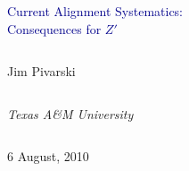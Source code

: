 \documentclass[compress]{beamer}
\begin{document}
\begin{frame}
\vfill
\begin{center}
\textcolor{darkblue}{\Large Current Alignment Systematics: \\ \vspace{0.2 cm} Consequences for $Z'$}

\vfill
\begin{columns}
\begin{center}
\large
Jim Pivarski
\end{center}
\end{columns}

\begin{columns}
\begin{center}
\scriptsize
{\it Texas A\&M University}
\end{center}
\end{columns}

\vfill
 6 August, 2010

\end{center}
\end{frame}


\small
\end{document}
